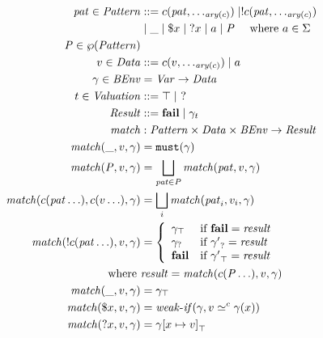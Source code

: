 \begin{figure}
  \begin{align*}
    \mpat \in \Pattern &::= \mconstructor(\mpat, \ldots_{\ary(\mconstructor)}) \alt \snonevent{\mconstructor(\mpat, \ldots_{\ary(\mconstructor)})} \\
     & \alt \swc \alt \sref{\mvar} \alt \sbind{\mvar} \alt \matom \alt \mpatset
      \quad\text{ where } \matom \in \Sigma
\\
    \mpatset \in \wp(\Pattern)
\\
    \mdata \in \Qualified &::= \mconstructor(\mdata, \ldots_{\ary(\mconstructor)}) \alt \matom
\\
    \mbindenv \in \BindEnv &= \Var \to \Qualified
\\
    t \in \Valuation &::= \top \alt\ ?
\\
    \MatchResult &::= \mfail \alt \smatch{\mbindenv}{t}
\\
    \match &: \Pattern \times \Qualified \times \BindEnv \to \MatchResult
\\
    \match(\swc, \mdata, \mbindenv) &= \smust{\mbindenv}
\\
    \match(\mpatset, \mdata, \mbindenv) &= \bigsqcup\limits_{\mpat \in \mpatset}{\match(\mpat, \mdata, \mbindenv)}
\\
    \match(\mconstructor(\mpat \ldots), \mconstructor(\mdata \ldots), \mbindenv) &=
      \bigsqcup\limits_i{\match(\mpat_i, \mdata_i, \mbindenv)}
\\
    \match(\snonevent{\mconstructor(\mpat \ldots)}, \mdata, \mbindenv) &=
      \left\{\begin{array}{ll}
               \smatch{\mbindenv}{\top} & \text{if } \mfail = \mres \\
               \smatch{\mbindenv}{?} & \text{if } \smatch{\mbindenv'}{?} = \mres \\
               \mfail & \text{if } \smatch{\mbindenv'}{\top} = \mres \\
             \end{array}\right.
    \\ \text{where }& \mres = \match(\mconstructor(\mpatset \ldots), \mdata, \mbindenv)
\\
    \match(\swc, \mdata, \mbindenv) &= \smatch{\mbindenv}{\top}
\\
    \match(\sref{\mvar}, \mdata, \mbindenv) &= \weakif(\mbindenv, \mdata \simeq^\mconstructor \mbindenv(\mvar))
\\
    \match(\sbind{\mvar}, \mdata, \mbindenv) &= \smatch{\mbindenv[\mvar \mapsto \mdata]}{\top}

\end{align*}
\end{figure}
